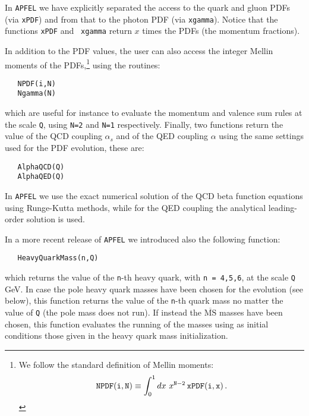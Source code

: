 \documentclass[11pt,a4paper]{article}
\newcommand{\be}{\begin{equation}}
\newcommand{\ee}{\end{equation}}
\newcommand{\MSbar}{\overline{\mathrm{MS}}}
\begin{document}
In {\tt APFEL} we have explicitly separated the access to the quark
and gluon PDFs (via {\tt xPDF}) and from that to the photon PDF
(via {\tt xgamma}). Notice that the functions {\tt xPDF} and {\tt
  xgamma} return $x$ times the PDFs (the momentum fractions).

In addition to the PDF values, the user can also access the integer Mellin moments of
the PDFs,\footnote{We follow the standard definition of
Mellin moments:
\be
{\tt NPDF(i,N)}\equiv \int_0^1 dx~x^{{\tt N-2}}\, {\tt xPDF(i,x)} \, .
\ee
} using the routines:
\begin{lstlisting}
   NPDF(i,N)
   Ngamma(N)
\end{lstlisting}
which are useful for instance to evaluate the momentum 
and valence sum rules at the scale {\tt Q}, using {\tt N=2} and
{\tt N=1} respectively.
%
Finally, two functions return the value of the QCD coupling $\alpha_s$ and of the QED
coupling $\alpha$ using the same settings used for the PDF evolution, these are:
\begin{lstlisting}
   AlphaQCD(Q)
   AlphaQED(Q)
\end{lstlisting}
In {\tt APFEL} we use the exact numerical solution of the QCD beta function
equations
using Runge-Kutta methods, while for the QED coupling the analytical
leading-order solution is used.

In a more recent release of {\tt APFEL} we introduced also the
following function:
\begin{lstlisting}
   HeavyQuarkMass(n,Q)
\end{lstlisting}
which returns the value of the {\tt n}-th heavy quark, with {\tt n =
  4,5,6}, at the scale {\tt Q} GeV. In case the pole heavy quark
masses have been chosen for the evolution (see below), this function returns the
value of the {\tt n}-th quark mass no matter the value of {\tt Q} (the
pole mass does not run). If instead the $\MSbar$ masses have been
chosen, this function evaluates the running of the masses using as initial
conditions those given in the heavy quark mass initialization.
\end{document}
